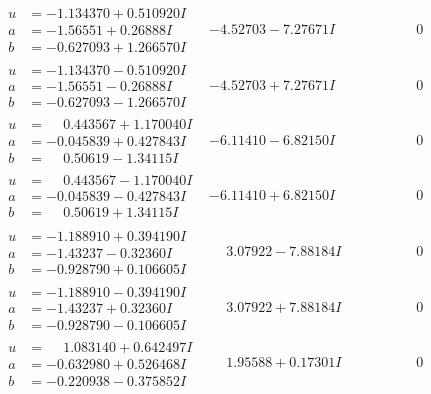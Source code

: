 \documentclass[1p]{elsarticle_modified}
\theoremstyle{definition}
\begin{document}
$$\begin{array}{c|c|c}
\begin{aligned}
u &= -1.134370 + 0.510920 I \\
a &= -1.56551 + 0.26888 I \\
b &= -0.627093 + 1.266570 I\end{aligned}
 & -4.52703 - 7.27671 I & \phantom{-0.000000 } 0 \\ \hline\begin{aligned}
u &= -1.134370 - 0.510920 I \\
a &= -1.56551 - 0.26888 I \\
b &= -0.627093 - 1.266570 I\end{aligned}
 & -4.52703 + 7.27671 I & \phantom{-0.000000 } 0 \\ \hline\begin{aligned}
u &= \phantom{-}0.443567 + 1.170040 I \\
a &= -0.045839 + 0.427843 I \\
b &= \phantom{-}0.50619 - 1.34115 I\end{aligned}
 & -6.11410 - 6.82150 I & \phantom{-0.000000 } 0 \\ \hline\begin{aligned}
u &= \phantom{-}0.443567 - 1.170040 I \\
a &= -0.045839 - 0.427843 I \\
b &= \phantom{-}0.50619 + 1.34115 I\end{aligned}
 & -6.11410 + 6.82150 I & \phantom{-0.000000 } 0 \\ \hline\begin{aligned}
u &= -1.188910 + 0.394190 I \\
a &= -1.43237 - 0.32360 I \\
b &= -0.928790 + 0.106605 I\end{aligned}
 & \phantom{-}3.07922 - 7.88184 I & \phantom{-0.000000 } 0 \\ \hline\begin{aligned}
u &= -1.188910 - 0.394190 I \\
a &= -1.43237 + 0.32360 I \\
b &= -0.928790 - 0.106605 I\end{aligned}
 & \phantom{-}3.07922 + 7.88184 I & \phantom{-0.000000 } 0 \\ \hline\begin{aligned}
u &= \phantom{-}1.083140 + 0.642497 I \\
a &= -0.632980 + 0.526468 I \\
b &= -0.220938 - 0.375852 I\end{aligned}
 & \phantom{-}1.95588 + 0.17301 I & \phantom{-0.000000 } 0 \\ \hline\begin{aligned}

\end{aligned}
\end{array}$$
\end{document}

